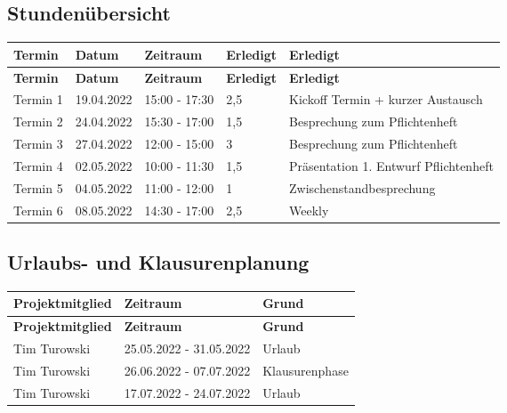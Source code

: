 \subsection{Stundenübersicht}

\begin{flushleft}
		\begin{longtable}{p{2cm}p{2cm}p{3cm}p{2cm}p{8cm}}
            \toprule
            \textbf{Termin} & \textbf{Datum} & \textbf{Zeitraum} & \textbf{Erledigt} & \textbf{Erledigt}\\
            \midrule\endfirsthead
            \toprule
            \textbf{Termin} & \textbf{Datum} & \textbf{Zeitraum} & \textbf{Erledigt} & \textbf{Erledigt}\\
            \midrule\endhead
            	Termin 1 & 19.04.2022 & 15:00 - 17:30 & 2,5 & Kickoff Termin + kurzer Austausch \\ \midrule
				Termin 2 & 24.04.2022 & 15:30 - 17:00 & 1,5 & Besprechung zum Pflichtenheft \\ \midrule
				Termin 3 & 27.04.2022 & 12:00 - 15:00 & 3 & Besprechung zum Pflichtenheft \\ \midrule
				Termin 4 & 02.05.2022 & 10:00 - 11:30 & 1,5 & Präsentation 1. Entwurf Pflichtenheft \\ \midrule
				Termin 5 & 04.05.2022 & 11:00 - 12:00 & 1 & Zwischenstandbesprechung \\ \midrule
				Termin 6 & 08.05.2022 & 14:30 - 17:00 & 2,5 & Weekly\\
            \bottomrule
    \end{longtable}
\end{flushleft}

\subsection{Urlaubs- und Klausurenplanung}

\begin{flushleft}
		\begin{longtable}{p{4cm}p{6cm}p{8cm}}
            \toprule
            \textbf{Projektmitglied} & \textbf{Zeitraum} & \textbf{Grund} \\
            \midrule\endfirsthead
            \toprule
            \textbf{Projektmitglied} & \textbf{Zeitraum} & \textbf{Grund} \\
            \midrule\endhead
            	Tim Turowski & 25.05.2022 - 31.05.2022 & Urlaub \\ \midrule
				Tim Turowski & 26.06.2022 - 07.07.2022 & Klausurenphase \\ 
				Tim Turowski & 17.07.2022 - 24.07.2022 & Urlaub \\ \midrule

            \bottomrule
    \end{longtable}
\end{flushleft}

